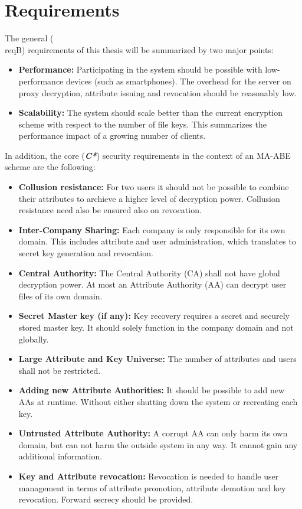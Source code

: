 \chapter{Requirements}
\label{sec:requirements}
The general (\\req{B}) requirements of this thesis will be summarized by two major points: 

\begin{itemize}
	\item[\req{B1}] \textbf{Performance:} Participating in the system should be possible with low-performance devices (such as smartphones). The overhead for the server on proxy decryption, attribute issuing and revocation should be reasonably low.  
	\item[\req{B2}] \textbf{Scalability:} The system should scale better than the current encryption scheme with respect to the number of file keys. This summarizes the performance impact of a growing number of clients.
\end{itemize}

In addition, the core (\textbf{\textit{C*}}) security requirements in the context of an \ac{MA-ABE} scheme are the following:
\begin{itemize}
\item[\req{C1}] \textbf{Collusion resistance:} For two users it should not be possible to combine their attributes to archieve a higher level of decryption power. Collusion resistance need also be ensured also on revocation. 
\item[\req{C2}] \textbf{Inter-Company Sharing:} Each company is only responsible for its own domain. This includes attribute and user administration, which translates to secret key generation and revocation. 
\item[\req{C3}] \textbf{Central Authority:} The Central Authority (\ac{CA}) shall not have global decryption power. At most an Attribute Authority (\ac{AA}) can decrypt user files of its own domain.  
\item[\req{C4}] \textbf{Secret Master key (if any):} Key recovery requires a secret and securely stored master key. It should solely function in the company domain and not globally. 
\item[\req{C5}] \textbf{Large Attribute and Key Universe:} The number of attributes and users shall not be restricted.
\item[\req{C6}] \textbf{Adding new Attribute Authorities:} It should be possible to add new AAs at runtime. Without either shutting down the system or recreating each key.
\item[\req{C7}] \textbf{Untrusted Attribute Authority:} A corrupt AA can only harm its own domain, but can not harm the outside system in any way. It cannot gain any additional information.
\item[\req{C8}] \textbf{Key and Attribute revocation:} Revocation is needed to handle user management in terms of attribute promotion, attribute demotion and key revocation. Forward secrecy should be provided.
\end{itemize}

